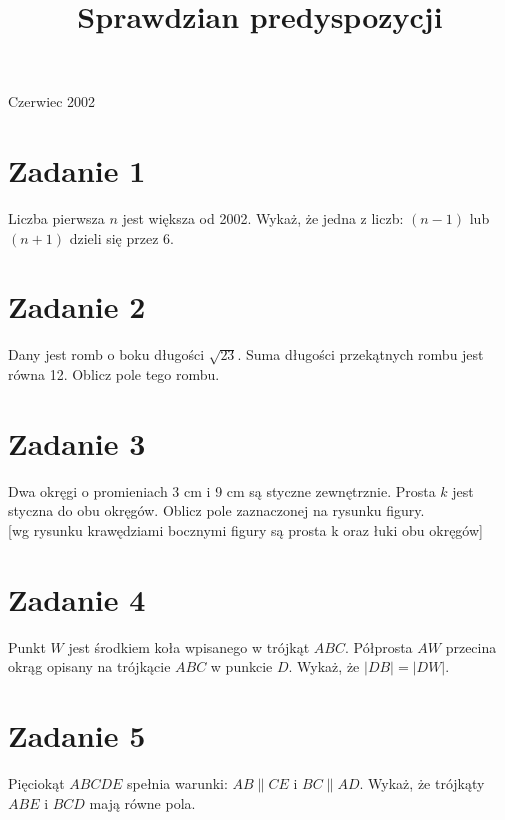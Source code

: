 \documentclass[10pt]{article}
\title{Sprawdzian predyspozycji }
\author{}
\date{}
\begin{document}
\maketitle
Czerwiec 2002

\section*{Zadanie 1}
Liczba pierwsza \(n\) jest większa od 2002. Wykaż, że jedna z liczb: \((n-1)\) lub \((n+1)\) dzieli się przez 6.

\section*{Zadanie 2}
Dany jest romb o boku długości \(\sqrt{23}\). Suma długości przekątnych rombu jest równa 12. Oblicz pole tego rombu.

\section*{Zadanie 3}
Dwa okręgi o promieniach 3 cm i 9 cm są styczne zewnętrznie. Prosta \(k\) jest styczna do obu okręgów. Oblicz pole zaznaczonej na rysunku figury.\\[0pt]
[wg rysunku krawędziami bocznymi figury są prosta k oraz łuki obu okręgów]

\section*{Zadanie 4}
Punkt \(W\) jest środkiem koła wpisanego w trójkąt \(A B C\). Półprosta \(A W\) przecina okrąg opisany na trójkącie \(A B C\) w punkcie \(D\). Wykaż, że \(|D B|=|D W|\).

\section*{Zadanie 5}
Pięciokąt \(A B C D E\) spełnia warunki: \(A B \| C E\) i \(B C \| A D\). Wykaż, że trójkąty \(A B E\) i \(B C D\) mają równe pola.
\end{document}

